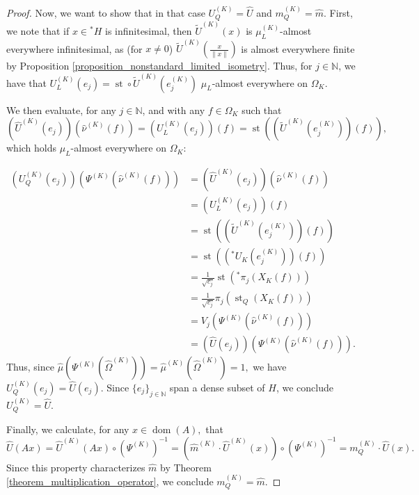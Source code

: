 \documentclass[10pt,a4paper]{amsart}
\def \Dom{\operatorname{dom}}
\def \St{\operatorname{st}}
\def \HOM{\hat{\Omega}}
\def \HMU{\hat{\mu}}
\def \HNU{\hat{\nu}}
\def \HU{\hat{U}}
\def \Hm{\hat{m}}
\begin{document}
\begin{proof}
	Now, we want to show that in that case $U_Q^{(K)}=\HU$ and $m_Q^{(K)}=\Hm.$ First, we note that if $x\in{}^*H$ is infinitesimal, then $\tilde{U}^{(K)}(x)$ is $\mu_L^{(K)}$-almost everywhere infinitesimal, as (for $x\neq 0$) $\tilde{U}^{(K)}(\frac{x}{\|x\|})$ is almost everywhere finite by Proposition \ref{proposition_nonstandard_limited_isometry}. Thus, for $j\in\mathbb{N}$, we  have that $U_L^{(K)}(e_j)=\St\circ\tilde{U}^{(K)}(e_j^{(K)})$ $\mu_L$-almost everywhere on $\Omega_K$. 
	
	We then evaluate, for any $j\in\mathbb{N}$, and with any $f\in\Omega_K$ such that $$(\HU^{(K)}(e_j))(\HNU^{(K)}(f))=(U_L^{(K)}(e_j))(f)=\St((\tilde{U}^{(K)}(e_j^{(K)}))(f)),$$ which holds $\mu_L$-almost everywhere on $\Omega_K$:
	
	\begin{align*}
		(U_Q^{(K)}(e_j))(\Psi^{(K)}(\HNU^{(K)}(f)))&=(\HU^{(K)}(e_j))(\HNU^{(K)}(f))\\
		&=(U_L^{(K)}(e_j))(f)\\
		&=\St((\tilde{U}^{(K)}(e_j^{(K)}))(f))\\
		&=\St(({}^*U_K(e_j^{(K)}))(f))\\
		&=\frac{1}{\sqrt{c_j}}\St({}^*\pi_j(X_K(f)))\\
		&=\frac{1}{\sqrt{c_j}}\pi_j\left(\St_Q(X_K(f))\right)\\
		&=V_j(\Psi^{(K)}(\HNU^{(K)}(f)))\\
		&=(\HU(e_j))(\Psi^{(K)}(\HNU^{(K)}(f))).
	\end{align*}
	Thus, since $\HMU(\Psi^{(K)}(\HOM^{(K)}))=\HMU^{(K)}(\HOM^{(K)})=1,$ we have $U_Q^{(K)}(e_j)=\HU(e_j).$ Since $\{e_j\}_{j\in\mathbb{N}}$ span a dense subset of $H$, we conclude $U_Q^{(K)}=\HU.$
	
	Finally, we calculate, for any $x\in\Dom(A),$ that  $$\HU(Ax)=\HU^{(K)}(Ax)\circ (\Psi^{(K)})^{-1}= (\Hm^{(K)}\cdot \HU^{(K)}(x))\circ (\Psi^{(K)})^{-1}=m_Q^{(K)}\cdot \HU(x). $$ Since this property characterizes $\Hm$ by Theorem \ref{theorem_multiplication_operator}, we conclude $m_Q^{(K)}=\Hm$.
\end{proof}
\end{document}
